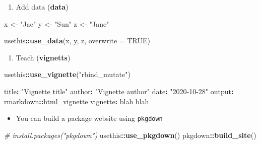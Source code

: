 \documentclass[
]{book}
\newenvironment{Shaded}{\begin{snugshade}}{\end{snugshade}}
\newcommand{\CommentTok}[1]{\textcolor[rgb]{0.56,0.35,0.01}{\textit{#1}}}
\newcommand{\DataTypeTok}[1]{\textcolor[rgb]{0.13,0.29,0.53}{#1}}
\newcommand{\KeywordTok}[1]{\textcolor[rgb]{0.13,0.29,0.53}{\textbf{#1}}}
\newcommand{\NormalTok}[1]{#1}
\newcommand{\OperatorTok}[1]{\textcolor[rgb]{0.81,0.36,0.00}{\textbf{#1}}}
\newcommand{\OtherTok}[1]{\textcolor[rgb]{0.56,0.35,0.01}{#1}}
\newcommand{\StringTok}[1]{\textcolor[rgb]{0.31,0.60,0.02}{#1}}
\providecommand{\tightlist}{%
  \setlength{\itemsep}{0pt}\setlength{\parskip}{0pt}}
\begin{document}
\begin{enumerate}
\def\labelenumi{\arabic{enumi}.}
\setcounter{enumi}{1}
\tightlist
\item
  Add data (\textbf{data})
\end{enumerate}

\begin{Shaded}
\begin{Highlighting}[]
\NormalTok{x \textless{}{-}}\StringTok{ "Jae"}
\NormalTok{y \textless{}{-}}\StringTok{ "Sun"}
\NormalTok{z \textless{}{-}}\StringTok{ "Jane"}

\NormalTok{usethis}\OperatorTok{::}\KeywordTok{use\_data}\NormalTok{(x, y, z, }\DataTypeTok{overwrite =} \OtherTok{TRUE}\NormalTok{)}
\end{Highlighting}
\end{Shaded}

\begin{enumerate}
\def\labelenumi{\arabic{enumi}.}
\setcounter{enumi}{2}
\tightlist
\item
  Teach (\textbf{vignetts})
\end{enumerate}

\begin{Shaded}
\begin{Highlighting}[]
\NormalTok{usethis}\OperatorTok{::}\KeywordTok{use\_vignette}\NormalTok{(}\StringTok{"rbind\_mutate"}\NormalTok{)}
\end{Highlighting}
\end{Shaded}

\begin{Shaded}
\begin{Highlighting}[]
\NormalTok{title}\OperatorTok{:}\StringTok{ "Vignette title"}
\NormalTok{author}\OperatorTok{:}\StringTok{ "Vignette author"}
\NormalTok{date}\OperatorTok{:}\StringTok{ "2020{-}10{-}28"}
\NormalTok{output}\OperatorTok{:}\StringTok{ }\NormalTok{rmarkdown}\OperatorTok{::}\NormalTok{html\_vignette}
\NormalTok{vignette}\OperatorTok{:}\StringTok{ }\NormalTok{blah blah}
\end{Highlighting}
\end{Shaded}

\begin{itemize}
\tightlist
\item
  You can build a package website using \texttt{pkgdown}
\end{itemize}

\begin{Shaded}
\begin{Highlighting}[]
\CommentTok{\# install.packages("pkgdown")}
\NormalTok{usethis}\OperatorTok{::}\KeywordTok{use\_pkgdown}\NormalTok{()}
\NormalTok{pkgdown}\OperatorTok{::}\KeywordTok{build\_site}\NormalTok{()}
\end{Highlighting}
\end{Shaded}
\end{document}
